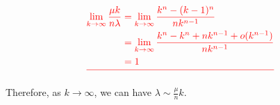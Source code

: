 \documentclass[10pt, conference, letterpaper]{IEEEtran}
\providecommand{\DIFadd}[1]{{\protect\color{blue}\uwave{#1}}} %
\providecommand{\DIFdel}[1]{{\protect\color{red}\sout{#1}}}                      %
\providecommand{\DIFaddbegin}{} %
\providecommand{\DIFaddend}{} %
\providecommand{\DIFdelbegin}{} %
\providecommand{\DIFdelend}{} %
\newcommand{\DIFscaledelfig}{0.5}
\newlength{\DIFdelgraphicswidth} %
\newlength{\DIFdelgraphicsheight} %
\newcommand{\DIFaddincludegraphics}[2][]{{\color{blue}\fbox{\DIFOincludegraphics[#1]{#2}}}} %
\newcommand{\DIFdelincludegraphics}[2][]{%
\sbox{\DIFdelgraphicsbox}{\DIFOincludegraphics[#1]{#2}}%
\settoboxwidth{\DIFdelgraphicswidth}{\DIFdelgraphicsbox} %
\settoboxtotalheight{\DIFdelgraphicsheight}{\DIFdelgraphicsbox} %
\scalebox{\DIFscaledelfig}{%
\parbox[b]{\DIFdelgraphicswidth}{\usebox{\DIFdelgraphicsbox}\\[-\baselineskip] \rule{\DIFdelgraphicswidth}{0em}}\llap{\resizebox{\DIFdelgraphicswidth}{\DIFdelgraphicsheight}{%
\setlength{\unitlength}{\DIFdelgraphicswidth}%
\begin{picture}(1,1)%
\thicklines\linethickness{2pt} %
{\color[rgb]{1,0,0}\put(0,0){\framebox(1,1){}}}%
{\color[rgb]{1,0,0}\put(0,0){\line( 1,1){1}}}%
{\color[rgb]{1,0,0}\put(0,1){\line(1,-1){1}}}%
\end{picture}%
}\hspace*{3pt}}} %
} %
\DeclareRobustCommand{\DIFaddbegin}{\DIFOaddbegin \let\includegraphics\DIFaddincludegraphics} %
\DeclareRobustCommand{\DIFaddend}{\DIFOaddend \let\includegraphics\DIFOincludegraphics} %
\DeclareRobustCommand{\DIFdelbegin}{\DIFOdelbegin \let\includegraphics\DIFdelincludegraphics} %
\DeclareRobustCommand{\DIFdelend}{\DIFOaddend \let\includegraphics\DIFOincludegraphics} %
\begin{document}
\DIFdelbegin \begin{displaymath} \DIFdel{%
	\begin{split}
		\lim_{k\rightarrow \infty} \frac{\mu k}{n \lambda}&=  \lim_{k\rightarrow \infty} \frac{k^n-(k-1)^n}{n k^{n-1}} \\
		&=\lim_{k\rightarrow \infty}  \frac{k^n-k^n+n k^{n-1}+o(k^{n-1})}{n k^{n-1}} \\
		&= 1
	\end{split}
}\end{displaymath}%

\DIFdelend 

Therefore, as $ k \rightarrow \infty$, we can have \DIFdelbegin \DIFdel{$\lambda \sim \frac{\mu }{n}k $}\DIFdelend \DIFaddbegin \DIFadd{$\lambda \lesssim \cfrac{\mu}{n}\,k $}\DIFaddend .
\end{document}
